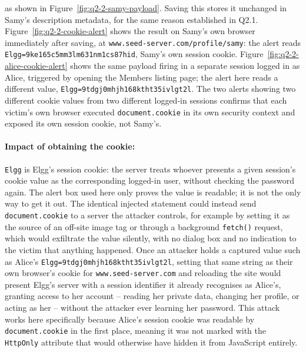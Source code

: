 as shown in Figure~\ref{fig:q2-2-samy-payload}. Saving this stores it unchanged in Samy's description metadata, for the same reason established in Q2.1. Figure~\ref{fig:q2-2-cookie-alert} shows the result on Samy's own browser immediately after saving, at \texttt{www.seed-server.com/profile/samy}: the alert reads \texttt{Elgg=9ke165c5mm3lm631nm1cs87hid}, Samy's own session cookie. Figure~\ref{fig:q2-2-alice-cookie-alert} shows the same payload firing in a separate session logged in as Alice, triggered by opening the Members listing page; the alert here reads a different value, \texttt{Elgg=9tdgj0mhjh168ktht35ivlgt2l}. The two alerts showing two different cookie values from two different logged-in sessions confirms that each victim's own browser executed \texttt{document.cookie} in its own security context and exposed its own session cookie, not Samy's.

\paragraph{Impact of obtaining the cookie:} \texttt{Elgg} is Elgg's session cookie: the server treats whoever presents a given session's cookie value as the corresponding logged-in user, without checking the password again. The alert box used here only proves the value is readable; it is not the only way to get it out. The identical injected statement could instead send \texttt{document.cookie} to a server the attacker controls, for example by setting it as the source of an off-site image tag or through a background \texttt{fetch()} request, which would exfiltrate the value silently, with no dialog box and no indication to the victim that anything happened. Once an attacker holds a captured value such as Alice's \texttt{Elgg=9tdgj0mhjh168ktht35ivlgt2l}, setting that same string as their own browser's cookie for \texttt{www.seed-server.com} and reloading the site would present Elgg's server with a session identifier it already recognises as Alice's, granting access to her account -- reading her private data, changing her profile, or acting as her -- without the attacker ever learning her password. This attack works here specifically because Alice's session cookie was readable by \texttt{document.cookie} in the first place, meaning it was not marked with the \texttt{HttpOnly} attribute that would otherwise have hidden it from JavaScript entirely.


